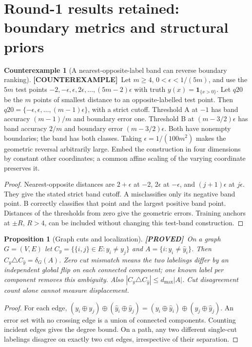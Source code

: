 \documentclass[11pt]{article}
\newtheorem{proposition}[theorem]{Proposition}
\theoremstyle{definition}
\newtheorem{example}[theorem]{Counterexample}
\newcommand{\1}{\mathbf 1}
\newcommand{\pr}{\textbf{[PROVED]}}
\newcommand{\ce}{\textbf{[COUNTEREXAMPLE]}}
\begin{document}
\section{Round-1 results retained: boundary metrics and structural priors}
\begin{example}[A nearest-opposite-label band can reverse boundary ranking]
\label{ex:q20}
\ce\ Let $m\ge4$, $0<\epsilon<1/(5m)$, and use the $5m$ test points
$-2,-\epsilon,\epsilon,2\epsilon,\ldots,(5m-2)\epsilon$ with truth
$y(x)=\1_{\{x>0\}}$. Let $q20$ be the $m$ points of smallest distance to
an opposite-labelled test point. Then
$q20=\{-\epsilon,\epsilon,\ldots,(m-1)\epsilon\}$, with a strict cutoff.
Threshold A at $-1$ has band accuracy $(m-1)/m$ and boundary error one.
Threshold B at $(m-3/2)\epsilon$ has band accuracy $2/m$ and boundary
error $(m-3/2)\epsilon$. Both have nonempty boundaries; the band has both
classes. Taking $\epsilon=1/(100m^2)$ makes the geometric reversal arbitrarily
large. Embed the construction in four dimensions by constant other
coordinates; a common affine scaling of the varying coordinate preserves it.
\end{example}
\begin{proof}
Nearest-opposite distances are $2+\epsilon$ at $-2$, $2\epsilon$ at
$-\epsilon$, and $(j+1)\epsilon$ at $j\epsilon$.
They give the stated strict band cutoff. A misclassifies only its negative
band point. B correctly classifies that point and the largest positive band
point. Distances of the thresholds from zero give the geometric errors.
Training anchors at $\pm R$, $R>4$, can be included without changing this
test-band construction.
\end{proof}

\begin{proposition}[Graph cuts and localization]\label{prop:cut}
\pr\ On a graph $G=(V,E)$ let $C_y=\{\{i,j\}\in E:y_i\ne y_j\}$ and
$A=\{i:y_i\ne\widehat y_i\}$. Then
$C_y\triangle C_{\widehat y}=\delta_G(A)$.
Zero cut mismatch means the two labelings differ by an independent global
flip on each connected component; one known label per component removes
this ambiguity. Also
$|C_y\triangle C_{\widehat y}|\le d_{\max}|A|$.
Cut disagreement count alone cannot measure displacement.
\end{proposition}
\begin{proof}
For each edge,
$(y_i\oplus y_j)\oplus(\widehat y_i\oplus\widehat y_j)
 =(y_i\oplus\widehat y_i)\oplus(y_j\oplus\widehat y_j)$.
An error set with no crossing edge is a union of connected components.
Counting incident edges gives the degree bound. On a path, any two different
single-cut labelings disagree on exactly two cut edges, irrespective of
their separation.
\end{proof}
\end{document}
